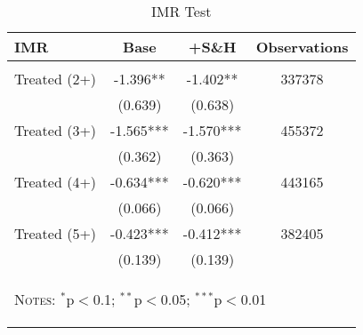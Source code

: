 \begin{table}[htpb!]\caption{IMR Test} 
\label{TWINtab:IMR}\vspace{-5mm}\begin{center}\begin{tabular}{lccc}
\toprule \toprule 
\textsc{IMR}& Base & +S\&H & Observations \\ \midrule 
\begin{footnotesize}\end{footnotesize}& 
\begin{footnotesize}\end{footnotesize}& 
\begin{footnotesize}\end{footnotesize}& 
\begin{footnotesize}\end{footnotesize}\\ 
Treated (2+)&-1.396**&-1.402**&337378\\
&(0.639)&(0.638)&\\
Treated (3+)\hspace{5mm}&-1.565***&-1.570***&455372\\
&(0.362)&(0.363)&\\
Treated (4+)&-0.634***&-0.620***&443165\\
&(0.066)&(0.066)&\\
Treated (5+)&-0.423***&-0.412***&382405\\
&(0.139)&(0.139)&\\
\midrule\multicolumn{4}{p{7cm}}{\begin{footnotesize}\textsc{Notes:} $^{*}$p$<$0.1; $^{**}$p$<$0.05; $^{***}$p$<$0.01 
\end{footnotesize}} \\ \bottomrule 
\end{tabular}\end{center}\end{table}